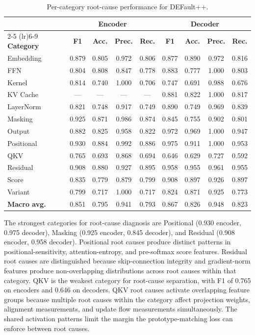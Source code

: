 \begin{table}[!htbp]
\centering
\caption{Per-category root-cause performance for DEFault++.}
\label{tab:perf_level3_category}
\small
\begin{tabular}{l c c c c c c c c}
\toprule
& \multicolumn{4}{c}{\textbf{Encoder}} & \multicolumn{4}{c}{\textbf{Decoder}} \\
\cmidrule(lr){2-5} \cmidrule(lr){6-9}
\textbf{Category} & \textbf{F1} & \textbf{Acc.} & \textbf{Prec.} & \textbf{Rec.} & \textbf{F1} & \textbf{Acc.} & \textbf{Prec.} & \textbf{Rec.} \\
\midrule
Embedding & 0.879 & 0.805 & 0.972 & 0.806 & 0.877 & 0.890 & 0.972 & 0.816 \\
FFN & 0.804 & 0.808 & 0.847 & 0.778 & 0.883 & 0.777 & 1.000 & 0.803 \\
Kernel & 0.814 & 0.740 & 1.000 & 0.706 & 0.747 & 0.691 & 0.988 & 0.676 \\
KV Cache & --- & --- & --- & --- & 0.881 & 0.822 & 1.000 & 0.817 \\
LayerNorm & 0.821 & 0.748 & 0.917 & 0.749 & 0.890 & 0.749 & 0.969 & 0.839 \\
Masking & 0.925 & 0.871 & 0.986 & 0.874 & 0.845 & 0.755 & 0.902 & 0.801 \\
Output & 0.882 & 0.825 & 0.958 & 0.822 & 0.972 & 0.969 & 1.000 & 0.947 \\
Positional & 0.930 & 0.884 & 0.992 & 0.886 & 0.975 & 0.911 & 1.000 & 0.953 \\
QKV & 0.765 & 0.693 & 0.868 & 0.694 & 0.646 & 0.629 & 0.727 & 0.592 \\
Residual & 0.908 & 0.880 & 0.927 & 0.895 & 0.958 & 0.955 & 0.961 & 0.955 \\
Score & 0.835 & 0.779 & 0.879 & 0.799 & 0.908 & 0.897 & 0.926 & 0.897 \\
Variant & 0.799 & 0.717 & 1.000 & 0.717 & 0.824 & 0.871 & 0.925 & 0.773 \\
\midrule
\textbf{Macro avg.} & 0.851 & 0.795 & 0.941 & 0.793 & 0.867 & 0.826 & 0.948 & 0.823 \\
\bottomrule
\end{tabular}
\end{table}

The strongest categories for root-cause diagnosis are Positional (0.930 encoder, 0.975 decoder), Masking (0.925 encoder, 0.845 decoder), and Residual (0.908 encoder, 0.958 decoder). Positional root causes produce distinct patterns in positional-sensitivity, attention-entropy, and pre-softmax score features. Residual root causes are distinguished because skip-connection integrity and gradient-norm features produce non-overlapping distributions across root causes within that category. QKV is the weakest category for root-cause separation, with F1 of 0.765 on encoders and 0.646 on decoders. QKV root causes activate overlapping feature groups because multiple root causes within the category affect projection weights, alignment measurements, and update flow measurements simultaneously. The shared activation patterns limit the margin the prototype-matching loss can enforce between root causes.

